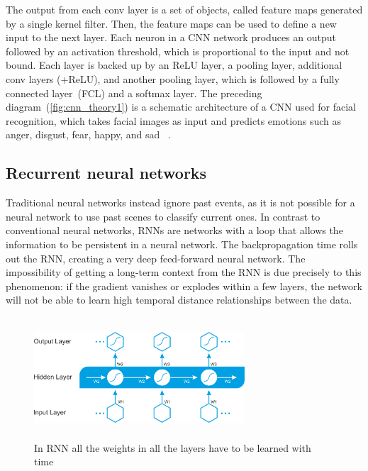 \hspace*{3.5mm} The output from each conv layer is a set of objects, called feature maps generated by a single kernel filter. Then, the feature maps can be used to define a new input to the next layer. Each neuron in a CNN network produces an output followed by an activation threshold, which is proportional to the input and not bound. Each layer is backed up by an ReLU layer, a pooling layer, additional conv layers (+ReLU), and another pooling layer, which is followed by a fully connected layer~(FCL) and a softmax layer. The preceding diagram~(\cref{fig:cnn_theory1}) is a schematic architecture of a CNN used for facial recognition, which takes facial images as input and predicts emotions such as anger, disgust, fear, happy, and sad ~\cite{karimDLTF2018}.  

\subsection{Recurrent neural networks}
Traditional neural networks instead ignore past events, as it is not possible for a neural network to use past scenes to classify current ones. In contrast to conventional neural networks, RNNs are networks with a loop that allows the information to be persistent in a neural network. The backpropagation time rolls out the RNN, creating a very deep feed-forward neural network. The impossibility of getting a long-term context from the RNN is due precisely to this phenomenon: if the gradient vanishes or explodes within a few layers, the network will not be able to learn high temporal distance relationships between the data. 

\begin{figure}[h]
    \centering
    \includegraphics[width=0.7\textwidth,height=45mm]{images/B09698_06_4.png}
    \caption{In RNN all the weights in all the layers have to be learned with time~\cite{karimDLTF2018}}
    \label{fig:rnn_theory1}
    \vspace{-2mm}
\end{figure}

